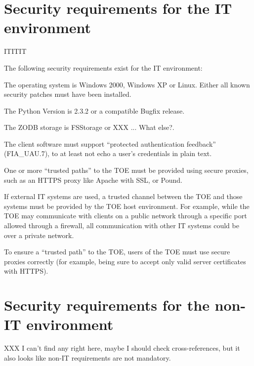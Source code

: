 \documentclass[10pt,a4paper,english]{book}
\begin{document}
\section{Security requirements for the IT environment}

ITITIT

The following security requirements exist for the IT environment:

The operating system is Windows 2000, Windows XP or Linux. Either all
known security patches must have been installed.

The Python Version is 2.3.2 or a compatible Bugfix release.

The ZODB storage is FSStorage or XXX ... What else?.

The client software must support ``protected authentication feedback''
(FIA{\_}UAU.7), to at least not echo a user's credentials in plain text.

One or more ``trusted paths'' to the TOE must be provided using secure
proxies, such as an HTTPS proxy like Apache with SSL, or Pound.

If external IT systems are used, a trusted channel between the TOE and
those systems must be provided by the TOE host environment.  For
example, while the TOE may communicate with clients on a public
network through a specific port allowed through a firewall, all
communication with other IT systems could be over a private network.

To ensure a ``trusted path'' to the TOE, users of the TOE must use
secure proxies correctly (for example, being sure to accept only
valid server certificates with HTTPS).



\hypertarget{security-requirements-for-the-non-it-environment}{}
\section{Security requirements for the non-IT environment}

XXX I can't find any right here, maybe I should check cross-references, but it
also looks like non-IT requirements are not mandatory.



\hypertarget{toe-summary-specification}{}
\end{document}
